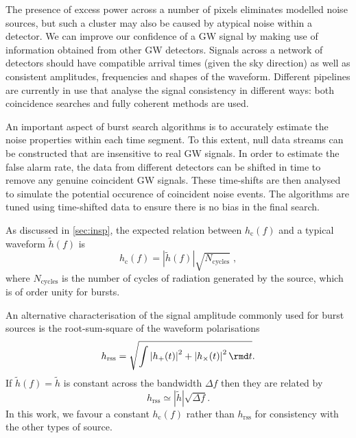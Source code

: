 The presence of excess power across a number of pixels eliminates modelled noise sources, but such a cluster may also be caused by atypical noise within a detector. We can improve our confidence of a GW signal by making use of information obtained from other GW detectors. Signals across a network of detectors should have compatible arrival times (given the sky direction) as well as consistent amplitudes, frequencies and shapes of the waveform. Different pipelines are currently in use that analyse the signal consistency in different ways: both coincidence searches \citep{Chatterji2004} and fully coherent methods \citep{Klimenko2008} are used.

An important aspect of burst search algorithms is to accurately estimate the noise properties within each time segment. To this extent, null data streams can be constructed that are insensitive to real GW signals. In order to estimate the false alarm rate, the data from different detectors can be shifted in time to remove any genuine coincident GW signals. These time-shifts are then analysed to simulate the potential occurence of coincident noise events. The algorithms are tuned using time-shifted data to ensure there is no bias in the final search.

As discussed in \ref{sec:insp}, the expected relation between $h_\mathrm{c}(f)$ and a typical waveform $\tilde{h}(f)$ is
\begin{equation}\label{eq:simple} 
h_\mathrm{c}(f) = \left|\tilde{h}(f)\right|\sqrt{{N}_{\mathrm{cycles}}} \; , 
\end{equation}
where ${N}_{\mathrm{cycles}}$ is the number of cycles of radiation generated by the source, which is of order unity for bursts. 

An alternative characterisation of the signal amplitude commonly used for burst sources is the root-sum-square of the waveform polarisations
\begin{equation}
h_\mathrm{rss} = \sqrt{\int{|h_+(t)|}^2 + {|h_\times(t)|}^2\,\rmd t}.
\end{equation}
If $\tilde{h}(f) = \tilde{h}$ is constant across the bandwidth $\Delta f$ then they are related by
\begin{equation}
h_\mathrm{rss} \simeq |\tilde{h}|\sqrt{\Delta f}.
\end{equation}
In this work, we favour a constant $h_\mathrm{c}(f)$ rather than $h_\mathrm{rss}$ for consistency with the other types of source.


